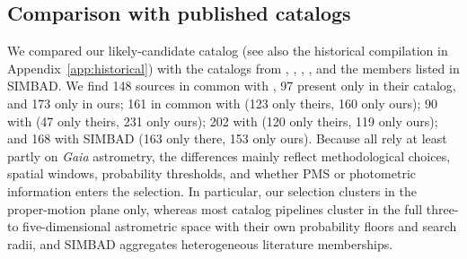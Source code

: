 \documentclass{aa}
\begin{document}
\subsection{Comparison with published catalogs}
We compared our likely-candidate catalog (see also the historical compilation in Appendix~\ref{app:historical}) with the catalogs from \citet{2020AA...640A...1C}, \citet{2021ApJ...923..129J}, \citet{2022ApJS..262....7H}, \citet{2024arXiv240305143H}, and the members listed in SIMBAD\@. We find 148 sources in common with \citet{2020AA...640A...1C}, 97 present only in their catalog, and 173 only in ours; 161 in common with \citet{2021ApJ...923..129J} (123 only theirs, 160 only ours); 90 with \citet{2022ApJS..262....7H} (47 only theirs, 231 only ours); 202 with \citet{2024arXiv240305143H} (120 only theirs, 119 only ours); and 168 with SIMBAD (163 only there, 153 only ours). Because all rely at least partly on \textit{Gaia} astrometry, the differences mainly reflect methodological choices, spatial windows, probability thresholds, and whether PMS or photometric information enters the selection. In particular, our selection clusters in the proper-motion plane only, whereas most catalog pipelines cluster in the full three- to five-dimensional astrometric space with their own probability floors and search radii, and SIMBAD aggregates heterogeneous literature memberships.
\end{document}

